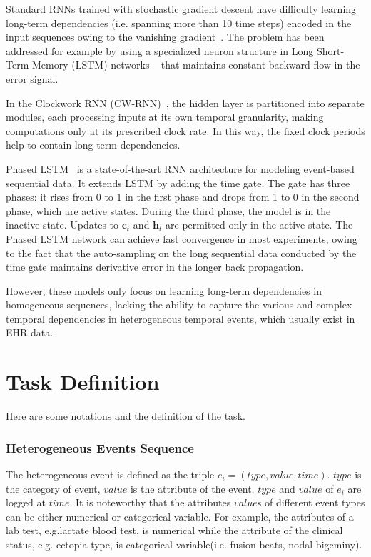 \documentclass[letterpaper]{article} %
\begin{document}
 Standard RNNs trained with stochastic gradient descent
have difficulty learning long-term dependencies (i.e. spanning
more than 10 time steps) encoded in the input sequences
owing to the vanishing gradient~\cite{hochreiter2001gradient}. The problem has been addressed for example by using a specialized neuron structure in Long Short-Term Memory (LSTM) networks ~\cite{hochreiter1997long} that maintains constant backward flow in the error signal.

In the Clockwork RNN (CW-RNN)~\cite{koutnik2014clockwork}, the hidden layer is partitioned into separate modules, each processing inputs at its own temporal granularity, making computations only at its prescribed clock rate. In this way, the fixed clock periods help to contain long-term dependencies.

Phased LSTM ~\cite{neil2016phased}is a state-of-the-art RNN architecture for modeling event-based sequential data. It extends LSTM by adding the time gate.  The gate has three phases: it rises from 0 to 1 in the first phase and drops from 1 to 0 in the second phase, which are active states. During the third phase, the model is in the inactive state. Updates to $\bm c_t$ and $\bm h_t$ are permitted only in the active state. The Phased LSTM network can achieve fast convergence in most experiments, owing to the fact that the auto-sampling on the long sequential data conducted by the time gate maintains derivative error in the longer back propagation.

However, these models only focus on learning long-term dependencies in homogeneous sequences, lacking the ability to capture the various and complex temporal dependencies in heterogeneous temporal events, which usually exist in EHR data.



\section{Task Definition}
Here are some notations and the definition of the task.

\subsubsection{Heterogeneous Events Sequence}
The heterogeneous event is defined as the triple $e_i = (type,value,time)$.  $type$ is the category of event, $value$ is the attribute of the event, $type$ and $value$ of $e_i$ are logged at $time$.  %
It is noteworthy that the attributes $value$s of different event types  can be either numerical or categorical variable. For example, the attributes of a lab test, e.g.lactate blood  test, is numerical while the attribute of the clinical status, e.g. ectopia type, is categorical variable(i.e. fusion beats, nodal bigeminy).
\end{document}
